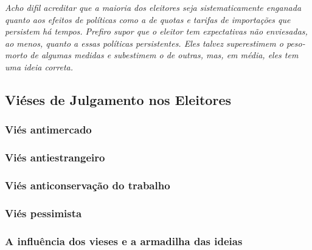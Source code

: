 \begin{citacao}
    \textit{Acho difil acreditar que a maioria dos eleitores seja sistematicamente enganada quanto aos efeitos de políticas como a de quotas e tarifas de importações que persistem há tempos. Prefiro supor que o eleitor tem expectativas não enviesadas, ao menos, quanto a essas políticas persistentes. Eles talvez superestimem o peso-morto de algumas medidas e subestimem o de outras, mas, em média, eles tem uma ideia correta.
    }  \cite{becker1976}
\end{citacao}

\subsection{Viéses de Julgamento nos Eleitores}




\subsubsection{Viés antimercado}


\subsubsection{Viés antiestrangeiro}


\subsubsection{Viés anticonservação do trabalho}


\subsubsection{Viés pessimista}


\subsubsection{A influência dos vieses e a armadilha das ideias}


